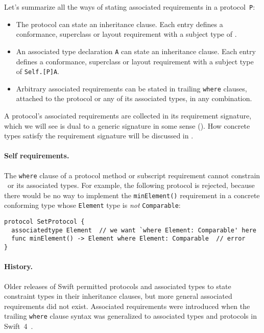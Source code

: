 \documentclass[../generics]{subfiles}
\begin{document}
Let's summarize all the ways of stating associated requirements in a protocol~\texttt{P}:
\begin{itemize}
\item The protocol can state an inheritance clause. Each entry defines a conformance, superclass or layout requirement with a subject type of \tSelf.
\item An associated type declaration \texttt{A} can state an inheritance clause. Each entry defines a conformance, superclass or layout requirement with a subject type of \texttt{Self.[P]A}.
\item Arbitrary associated requirements can be stated in trailing \texttt{where} clauses, attached to the protocol or any of its associated types, in any combination.
\end{itemize}

A protocol's associated requirements are collected in its requirement signature, which we will see is dual to a generic signature in some sense (). How concrete types satisfy the requirement signature will be discussed in .

\paragraph{Self requirements.}
The \texttt{where} clause of a protocol method or subscript requirement cannot constrain \tSelf\ or its associated types. For example, the following protocol is rejected, because there would be no way to implement the \texttt{minElement()} requirement in a concrete conforming type whose \texttt{Element} type is \emph{not} \texttt{Comparable}:
\begin{Verbatim}
protocol SetProtocol {
  associatedtype Element  // we want `where Element: Comparable' here
  func minElement() -> Element where Element: Comparable  // error
}
\end{Verbatim}

\paragraph{History.}
Older releases of Swift permitted protocols and associated types to state constraint types in their inheritance clauses, but more general associated requirements did not exist. Associated requirements were introduced when the trailing \texttt{where} clause syntax was generalized to associated types and protocols in Swift~4~\cite{se0142}.
\end{document}
